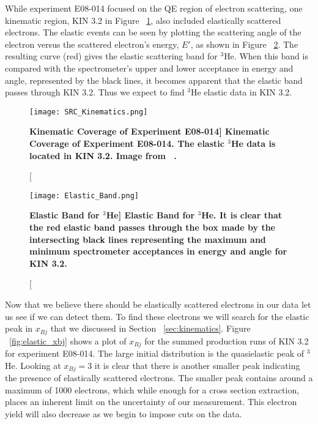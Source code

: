 While experiment E08-014 focused on the QE region of electron scattering, one kinematic region, KIN 3.2 in Figure ~\ref{fig:kin3.2}, also included elastically scattered electrons. The elastic events can be seen by plotting the scattering angle of the electron versus the scattered electron's energy, $E'$, as shown in Figure ~\ref{fig:elastic_band}. The resulting curve (red) gives the elastic scattering band for $^3$He. When this band is compared with the spectrometer's upper and lower acceptance in energy and angle, represented by the black lines, it becomes apparent that the elastic band passes through KIN 3.2. Thus we expect to find $^3$He elastic data in KIN 3.2. 

\begin{figure}[!ht]
\begin{center}
\texttt{[image: SRC\_Kinematics.png]}
\end{center}
\caption[\bf{Kinematic Coverage of Experiment E08-014}]{
{\bf{Kinematic Coverage of Experiment E08-014.}} The elastic $^3$He data is located in KIN 3.2. Image from ~\cite{Thesis:Ye}.}
\label{fig:kin3.2}
\end{figure}

\begin{figure}[!ht]
\begin{center}
\texttt{[image: Elastic\_Band.png]}
\end{center}
\caption[\bf{Elastic Band for $^3$He}]{
{\bf{Elastic Band for $^3$He.}} It is clear that the red elastic band passes through the box made by the intersecting black lines representing the maximum and minimum spectrometer acceptances in energy and angle for KIN 3.2.}
\label{fig:elastic_band}
\end{figure}

Now that we believe there should be elastically scattered electrons in our data let us see if we can detect them. To find these electrons we will search for the elastic peak in $x_{Bj}$ that we discussed in Section ~\ref{sec:kinematics}. Figure ~\ref{fig:elastic_xbj} shows a plot of $x_{Bj}$ for the summed production runs of KIN 3.2 for experiment E08-014. The large initial distribution is the quasielastic peak of $^3$He. Looking at $x_{Bj}=3$ it is clear that there is another smaller peak indicating the presence of elastically scattered electrons. The smaller peak contains around a maximum of 1000 electrons, which while enough for a cross section extraction, places an inherent limit on the uncertainty of our measurement. This electron yield will also decrease as we begin to impose cuts on the data.

